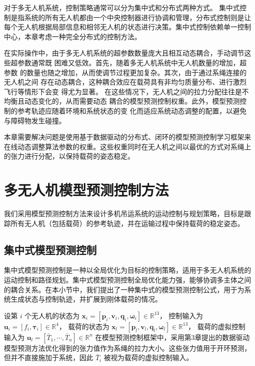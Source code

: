 \documentclass[lang=chs, degree=master, blindreview=false, winfonts=true]{yanputhesis}
\begin{document}
对于多无人机系统，控制策略通常可以分为集中式和分布式两种方式。
集中式控制是指系统的所有无人机都由一个中央控制器进行协调和管理，分布式控制则是让每个无人机根据局部信息和相邻无人机的状态进行决策。集中式控制依赖单一控制中心，本章考虑一种完全分布式的控制方法。

在实际操作中，由于多无人机系统的超参数数量庞大且相互动态耦合，手动调节这些超参数通常既
困难又低效。首先，随着多无人机系统中无人机数量的增加，超参数
的数量也随之增加，从而使调节过程更加复杂。其次，由于通过系绳连接的无人机之间
存在动态耦合，这种耦合效应在载荷具有非均匀质量分布、进行激烈飞行等情形下会变
得尤为显著。
在这些情况下，无人机之间的拉力分配往往是不均衡且动态变化的，从而需要动态
耦合的模型预测控制权重。此外，模型预测控制的参考轨迹应随着环境和系统状态的变
化而适应系统动态调整的配置，以避免与障碍物发生碰撞。

本章需要解决问题是使用基于数据驱动的分布式、闭环的模型预测控制学习框架来在线动态调整算法参数的权重。这些权重同时在无人机之间以最优的方式对系绳上的张力进行分配，以保持载荷的姿态稳定。


\section{多无人机模型预测控制方法}
我们采用模型预测控制方法来设计多机吊运系统的运动控制与规划策略，目标是跟踪所有无人机（包括载荷）的参考轨迹，并在运输过程中保持载荷的稳定姿态。
\subsection{集中式模型预测控制}


集中式模型预测控制是一种以全局优化为目标的控制策略，适用于多无人机系统的运动控制和路径规划。集中式模型预测控制全局优化能力强，能够协调多主体之间的耦合关系。在本小节中，我们提出了一种集中式的模型预测控制公式，用于为系统生成状态与控制轨迹，并扩展到刚体载荷的情况。

设第 \( i \) 个无人机的状态为 
\(
\bm{x}_i = \left[ \bm{p}_i, \bm{v}_i, \bm{q}_i, \bm{\omega}_i \right] \in \mathbb{R}^{13}
\)，
控制输入为 
\(
\bm{u}_i = \left[ f_i, \bm{\tau}_i \right] \in \mathbb{R}^4
\)，
载荷的状态为 
\(
\bm{x}_l = \left[ \bm{p}_l, \bm{v}_l, \bm{q}_l, \bm{\omega}_l \right] \in \mathbb{R}^{13}
\)，
载荷的虚拟控制输入为 
\(
\bm{u}_l = \left[ \bar{T}_1, \cdots, \bar{T}_n \right] \in \mathbb{R}^n
\)
在模型预测控制框架中，采用第3章提出的数据驱动模型预测方法优化得到的张力值作为系绳的拉力大小。这些张力值用于开环预测，但并不直接施加于系统，因此 \( \bar{T}_i \) 被视为载荷的虚拟控制输入。
\end{document}
